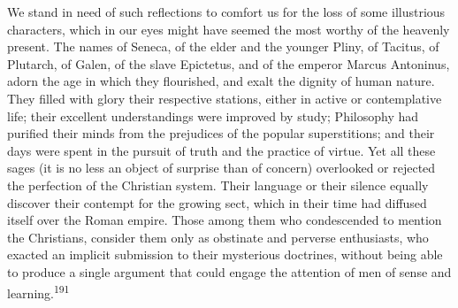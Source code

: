 
We stand in need of such reflections to comfort us for the loss
of some illustrious characters, which in our eyes might have
seemed the most worthy of the heavenly present. The names of
Seneca, of the elder and the younger Pliny, of Tacitus, of
Plutarch, of Galen, of the slave Epictetus, and of the emperor
Marcus Antoninus, adorn the age in which they flourished, and
exalt the dignity of human nature. They filled with glory their
respective stations, either in active or contemplative life;
their excellent understandings were improved by study; Philosophy
had purified their minds from the prejudices of the popular
superstitions; and their days were spent in the pursuit of truth
and the practice of virtue. Yet all these sages (it is no less an
object of surprise than of concern) overlooked or rejected the
perfection of the Christian system. Their language or their
silence equally discover their contempt for the growing sect,
which in their time had diffused itself over the Roman empire.
Those among them who condescended to mention the Christians,
consider them only as obstinate and perverse enthusiasts, who
exacted an implicit submission to their mysterious doctrines,
without being able to produce a single argument that could engage
the attention of men of sense and learning.\textsuperscript{191}


